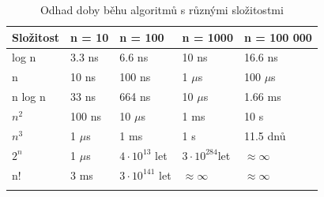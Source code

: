 \documentclass[12pt]{report}			%
\begin{document}
			\begin{table}[h]
			\centering
\begin{tabular}{lllll}
\hline
\multicolumn{1}{|r|}{Složitost} & \multicolumn{1}{l|}{n = 10}  & \multicolumn{1}{l|}{n = 100}                                                            & \multicolumn{1}{l|}{n = 1000}                & \multicolumn{1}{l|}{n = 100 000}        \\ \hline
\multicolumn{1}{|l|}{log n}                             & \multicolumn{1}{l|}{3.3 ns}  & \multicolumn{1}{l|}{6.6 ns}                                                           & \multicolumn{1}{l|}{10 ns}                 & \multicolumn{1}{l|}{16.6 ns}          \\ \hline
\multicolumn{1}{|l|}{n}                                 & \multicolumn{1}{l|}{10 ns}   & \multicolumn{1}{l|}{100 ns}                                                           & \multicolumn{1}{l|}{1 $\mu$s}               & \multicolumn{1}{l|}{100 $\mu$s}        \\ \hline
\multicolumn{1}{|l|}{n log n}                           & \multicolumn{1}{l|}{33 ns}   & \multicolumn{1}{l|}{664 ns}                                                           & \multicolumn{1}{l|}{10 $\mu$s}              & \multicolumn{1}{l|}{1.66 ms}          \\ \hline
\multicolumn{1}{|l|}{$n^2$}                             & \multicolumn{1}{l|}{100 ns}  & \multicolumn{1}{l|}{10 $\mu$s}                                                          & \multicolumn{1}{l|}{1 ms}                  & \multicolumn{1}{l|}{10 s}             \\ \hline
\multicolumn{1}{|l|}{$n^3$}                             & \multicolumn{1}{l|}{1 $\mu$s} & \multicolumn{1}{l|}{1 ms}                                                             & \multicolumn{1}{l|}{1 s}                   & \multicolumn{1}{l|}{11.5 dnů}         \\ \hline
\multicolumn{1}{|l|}{$2^n$}                             & \multicolumn{1}{l|}{1 $\mu$s} & \multicolumn{1}{l|}{$4 \cdot 10^{13}$ let} & \multicolumn{1}{l|}{$3 \cdot 10^{284}$let} & \multicolumn{1}{l|}{$\approx \infty$} \\ \hline
\multicolumn{1}{|l|}{n!}                                & \multicolumn{1}{l|}{3 ms}    & \multicolumn{1}{l|}{$3 \cdot 10^{141}$ let}                                           & \multicolumn{1}{l|}{$\approx\infty$}       & \multicolumn{1}{l|}{$\approx\infty$}  \\ \hline
                                                        &                              &                                                                                       &                                            &                                      
\end{tabular}
\caption{Odhad doby běhu algoritmů s různými složitostmi}
\label{tabulka}
\end{table}
\end{document}
